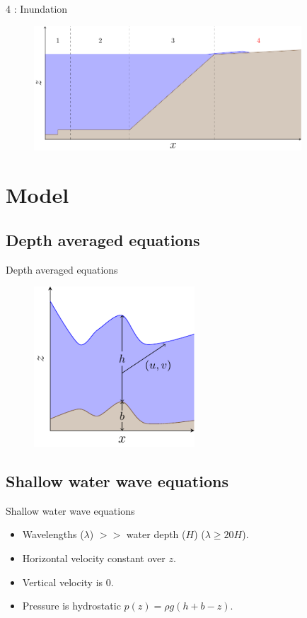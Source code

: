 \documentclass[pdf]{beamer}
\begin{document}
\begin{frame}{{\color{red} 4} : Inundation }
	\begin{figure}
		\includegraphics[width=10cm]{./Pics/Tsunami4.pdf}
	\end{figure}
\end{frame}

\section{Model}
\subsection{Depth averaged equations}

\begin{frame}{Depth averaged equations}
		\begin{figure}
			\includegraphics[width=6cm]{./Pics/SWWE.pdf}
		\end{figure}
\end{frame}

\subsection{Shallow water wave equations}
\begin{frame}{Shallow water wave equations}
	\begin{itemize}
		\item Wavelengths ($\lambda$) $>>$ water depth ($H$) ($\lambda \ge 20 H$).
		\smallskip
		\item Horizontal velocity constant over $z$.
		\item Vertical velocity is $0$.
		\item Pressure is hydrostatic $p(z) = \rho g(h + b - z)$.
	\end{itemize}
\end{frame}
\end{document}

